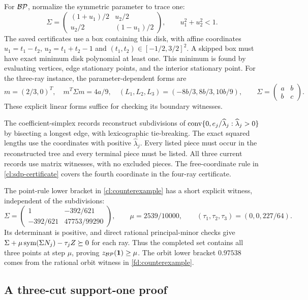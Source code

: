 For $\mathcal {BP}$, normalize the symmetric parameter to trace one:
\[
 \Sigma=\begin{pmatrix}(1+u_1)/2&u_2/2\\u_2/2&(1-u_1)/2\end{pmatrix},
 \qquad u_1^2+u_2^2<1.
\]
The saved certificates use a box containing this disk, with affine
coordinates $u_1=t_1-t_2$, $u_2=t_1+t_2-1$ and
$(t_1,t_2)\in[-1/2,3/2]^2$. A skipped box must have exact minimum
disk polynomial at least one. This minimum is found by evaluating
vertices, edge stationary points, and the interior stationary point.
For the three-ray instance, the parameter-dependent forms are
\[
 m=(2/3,0)^T,\quad m^T\Sigma m=4a/9,\quad
 (L_1,L_2,L_3)=(-8b/3,8b/3,10b/9),
 \qquad \Sigma=\begin{pmatrix}a&b\\b&c\end{pmatrix}.
\]
These explicit linear forms suffice for checking its boundary witnesses.

The coefficient-simplex records reconstruct subdivisions of
$\operatorname{conv}\{0,e_j/\widehat\lambda_j:\widehat\lambda_j>0\}$ by bisecting
a longest edge, with lexicographic tie-breaking. The exact squared
lengths use the coordinates with positive $\widehat\lambda_j$.
Every listed piece must occur in the reconstructed tree and every
terminal piece must be listed. All three current records use matrix
witnesses, with no excluded pieces. The free-coordinate rule in
\cref{cl:sdp-certificate} covers the fourth coordinate in the four-ray
certificate.

The point-rule lower bracket in \cref{cl:counterexample} has a short
explicit witness, independent of the subdivisions:
\[
 \Sigma=\begin{pmatrix}1&-392/621\\-392/621&47753/99290\end{pmatrix},
 \qquad \mu=2539/10000,\qquad
 (\tau_1,\tau_2,\tau_3)=(0,0,227/64).
\]
Its determinant is positive, and direct rational principal-minor checks
give
$\Sigma+\mu\operatorname{sym}(\Sigma N_j)-\tau_jZ\succeq0$ for each ray.
Thus the completed set contains all three points at step $\mu$, proving
$z_{\mathcal {BP}}(\mathbf1)\ge\mu$. The orbit lower bracket $0.97538$ comes from
the rational orbit witness in \cref{fd:counterexample}.

\subsection{A three-cut support-one proof}\label{cl:support-one-certificate}

